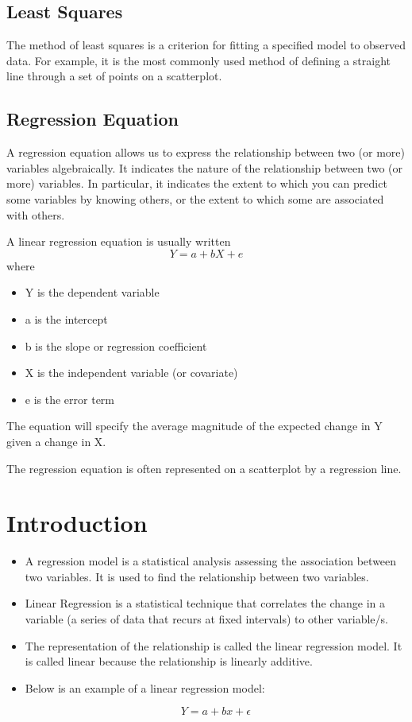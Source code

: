 \documentclass[]{report}
\begin{document}


\subsection{Least Squares}
The method of least squares is a criterion for fitting a specified model to observed data. 
For example, it is the most commonly used method of defining a straight line through a set of points on a scatterplot.




\subsection{Regression Equation}
A regression equation allows us to express the relationship between two (or more) variables algebraically. It indicates the nature of the relationship between two (or more) variables. In particular, it indicates the extent to which you can predict some variables by knowing others, or the extent to which some are associated with others.



A linear regression equation is usually written
\[Y = a + bX + e\]
where
\begin{itemize}
	\item Y is the dependent variable 
	\item a is the intercept 
	\item b is the slope or regression coefficient 
	\item X is the independent variable (or covariate) 
	\item e is the error term 
\end{itemize}
The equation will specify the average magnitude of the expected change in Y given a change in X.

The regression equation is often represented on a scatterplot by a regression line.


	\section{Introduction}
	\begin{itemize}
		\item A regression model is a statistical analysis assessing the association between two variables. It is used to find the relationship between two variables.
		
		\item Linear Regression is a statistical technique that correlates the change in a variable (a series of data that recurs at fixed intervals) to other variable/s. 
		
		\item The representation of the relationship is called the linear regression model. It is called linear because the relationship is linearly additive. 
		
		\item Below is an example of a linear regression model:
		
		\[Y= a + bx + \epsilon\]
	\end{itemize}
	\newpage
	
\end{document}
